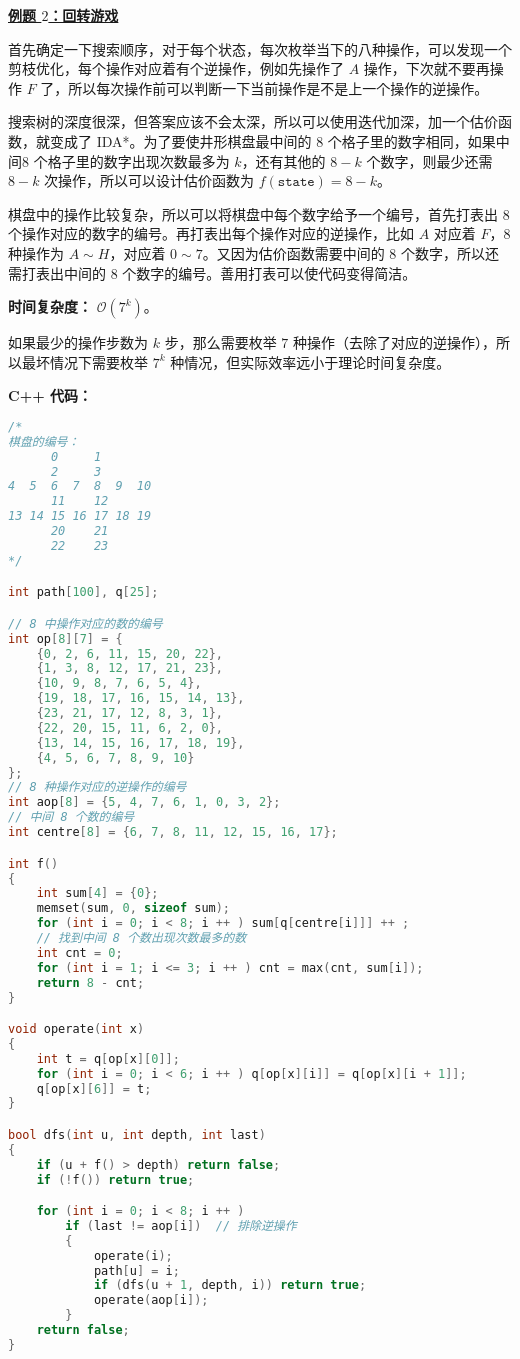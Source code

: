 \textbf{\href{http://poj.org/problem?id=2286}{例题 $2$：回转游戏}}

首先确定一下搜索顺序，对于每个状态，每次枚举当下的八种操作，可以发现一个剪枝优化，每个操作对应着有个逆操作，例如先操作了 $A$ 操作，下次就不要再操作 $F$ 了，所以每次操作前可以判断一下当前操作是不是上一个操作的逆操作。

搜索树的深度很深，但答案应该不会太深，所以可以使用迭代加深，加一个估价函数，就变成了 IDA*。为了要使井形棋盘最中间的 $8$ 个格子里的数字相同，如果中间$8$ 个格子里的数字出现次数最多为 $k$，还有其他的 $8 - k$ 个数字，则最少还需 $8 - k$ 次操作，所以可以设计估价函数为 $f(\texttt{state}) = 8 - k$。

棋盘中的操作比较复杂，所以可以将棋盘中每个数字给予一个编号，首先打表出 $8$ 个操作对应的数字的编号。再打表出每个操作对应的逆操作，比如 $A$ 对应着 $F$，$8$ 种操作为 $A \sim H$，对应着 $0 \sim 7$。又因为估价函数需要中间的 $8$ 个数字，所以还需打表出中间的 $8$ 个数字的编号。善用打表可以使代码变得简洁。

\textbf{时间复杂度：} $\mathcal{O}(7^k)$。

如果最少的操作步数为 $k$ 步，那么需要枚举 $7$ 种操作（去除了对应的逆操作），所以最坏情况下需要枚举 $7^k$ 种情况，但实际效率远小于理论时间复杂度。

\textbf{C++ 代码：}
\begin{lstlisting}[language=cpp]
/*
棋盘的编号：
      0     1
      2     3
4  5  6  7  8  9  10
      11    12
13 14 15 16 17 18 19
      20    21
      22    23
*/

int path[100], q[25];

// 8 中操作对应的数的编号
int op[8][7] = {
    {0, 2, 6, 11, 15, 20, 22},
    {1, 3, 8, 12, 17, 21, 23},
    {10, 9, 8, 7, 6, 5, 4},
    {19, 18, 17, 16, 15, 14, 13},
    {23, 21, 17, 12, 8, 3, 1},
    {22, 20, 15, 11, 6, 2, 0},
    {13, 14, 15, 16, 17, 18, 19},
    {4, 5, 6, 7, 8, 9, 10}
};
// 8 种操作对应的逆操作的编号
int aop[8] = {5, 4, 7, 6, 1, 0, 3, 2};
// 中间 8 个数的编号
int centre[8] = {6, 7, 8, 11, 12, 15, 16, 17};

int f()
{
    int sum[4] = {0};
    memset(sum, 0, sizeof sum);
    for (int i = 0; i < 8; i ++ ) sum[q[centre[i]]] ++ ;
    // 找到中间 8 个数出现次数最多的数
    int cnt = 0;
    for (int i = 1; i <= 3; i ++ ) cnt = max(cnt, sum[i]);
    return 8 - cnt;
}

void operate(int x)
{
    int t = q[op[x][0]];
    for (int i = 0; i < 6; i ++ ) q[op[x][i]] = q[op[x][i + 1]];
    q[op[x][6]] = t;
}

bool dfs(int u, int depth, int last)
{
    if (u + f() > depth) return false;
    if (!f()) return true;

    for (int i = 0; i < 8; i ++ )
        if (last != aop[i])  // 排除逆操作
        {
            operate(i);
            path[u] = i;
            if (dfs(u + 1, depth, i)) return true;
            operate(aop[i]);
        }
    return false;
}
\end{lstlisting}
